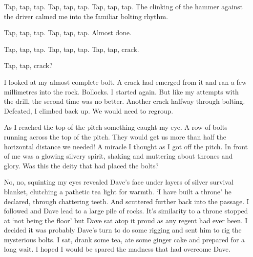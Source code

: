 Tap, tap, tap. Tap, tap, tap. Tap, tap, tap. The clinking of the hammer against the driver calmed me into the familiar bolting rhythm. 

Tap, tap, tap. Tap, tap, tap. Almost done. 

Tap, tap, tap. Tap, tap, tap. Tap, tap, crack. 

Tap, tap, crack? 

I looked at my almost complete bolt. A crack had emerged from it and ran a few millimetres into the rock. Bollocks. I started again. But like my attempts with the drill, the second time was no better. Another crack halfway through bolting. Defeated, I climbed back up. We would need to regroup.

As I reached the top of the pitch something caught my eye. A row of bolts running across the top of the pitch. They would get us more than half the horizontal distance we needed! A miracle I thought as I got off the pitch. In front of me was a glowing silvery spirit, shaking and muttering about thrones and glory. Was this the deity that had placed the bolts? 

No, no, squinting my eyes revealed Dave's face under layers of silver survival blanket, clutching a pathetic tea light for warmth. `I have built a throne' he declared, through chattering teeth. And scuttered further back into the passage. I followed and Dave lead to a large pile of rocks. It's similarity to a throne stopped at `not being the floor' but Dave sat atop it proud as any regent had ever been. I decided it was probably Dave's turn to do some rigging and sent him to rig the mysterious bolts. I sat, drank some tea, ate some ginger cake and prepared for a long wait. I hoped I would be spared the madness that had overcome Dave.

